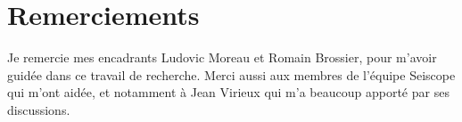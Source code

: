 \section*{Remerciements}

Je remercie mes encadrants Ludovic Moreau et Romain Brossier, pour m'avoir guidée dans ce travail de recherche.
Merci aussi aux membres de l'équipe Seiscope qui m'ont aidée, et notamment à Jean Virieux qui m'a beaucoup apporté par ses discussions.




